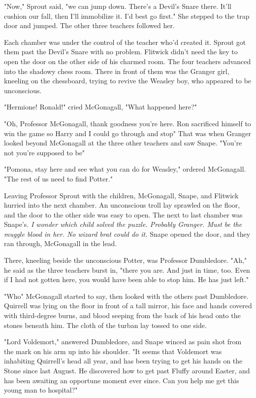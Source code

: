"Now," Sprout said, "we can jump down. There's a Devil's Snare there. It'll cushion our fall, then I'll immobilize it. I'd best go first." She stepped to the trap door and jumped. The other three teachers followed her.

Each chamber was under the control of the teacher who'd created it. Sprout got them past the Devil's Snare with no problem. Flitwick didn't need the key to open the door on the other side of his charmed room. The four teachers advanced into the shadowy chess room. There in front of them was the Granger girl, kneeling on the chessboard, trying to revive the Weasley boy, who appeared to be unconscious.

"Hermione! Ronald!" cried McGonagall, "What happened here?"

"Oh, Professor McGonagall, thank goodness you're here. Ron sacrificed himself to win the game so Harry and I could go through and stop{\el}" That was when Granger looked beyond McGonagall at the three other teachers and saw Snape. "You're not{\el} you're supposed to be{\el}"

"Pomona, stay here and see what you can do for Weasley," ordered McGonagall. "The rest of us need to find Potter."

Leaving Professor Sprout with the children, McGonagall, Snape, and Flitwick hurried into the next chamber. An unconscious troll lay sprawled on the floor, and the door to the other side was easy to open. The next to last chamber was Snape's. \emph{I wonder which child solved the puzzle. Probably Granger. Must be the muggle blood in her. No wizard brat could do it.} Snape opened the door, and they ran through, McGonagall in the lead.

There, kneeling beside the unconscious Potter, was Professor Dumbledore. "Ah," he said as the three teachers burst in, "there you are. And just in time, too. Even if I had not gotten here, you would have been able to stop him. He has just left."

"Who{\el}" McGonagall started to say, then looked with the others past Dumbledore. Quirrell was lying on the floor in front of a tall mirror, his face and hands covered with third-degree burns, and blood seeping from the back of his head onto the stones beneath him. The cloth of the turban lay tossed to one side.

"Lord Voldemort," answered Dumbledore, and Snape winced as pain shot from the mark on his arm up into his shoulder. "It seems that Voldemort was inhabiting Quirrell's head all year, and has been trying to get his hands on the Stone since last August. He discovered how to get past Fluffy around Easter, and has been awaiting an opportune moment ever since. Can you help me get this young man to hospital?"

